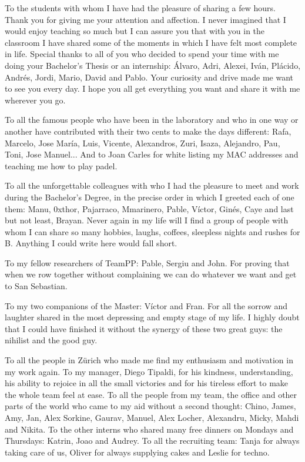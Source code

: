 To the students with whom I have had the pleasure of sharing a few hours. Thank you for giving me your attention and affection. I never imagined that I would enjoy teaching so much but I can assure you that with you in the classroom I have shared some of the moments in which I have felt most complete in life. Special thanks to all of you who decided to spend your time with me doing your Bachelor's Thesis or  an internship: Álvaro, Adri, Alexei, Iván, Plácido, Andrés, Jordi, Mario, David and Pablo. Your curiosity and drive made me want to see you every day. I hope you all get everything you want and share it with me wherever you go.

To all the famous people who have been in the laboratory and who in one way or another have contributed with their two cents to make the days different: Rafa, Marcelo, Jose María, Luis, Vicente, Alexandros, Zuri, Isaza, Alejandro, Pau, Toni, Jose Manuel... And to Joan Carles for white listing my MAC addresses and teaching me how to play padel.

To all the unforgettable colleagues with who I had the pleasure to meet and work during the Bachelor's Degree, in the precise order in which I greeted each of one them: Manu, 0xthor, Pajarraco, Mmarinero, Pable, Víctor, Ginés, Caye and last but not least, Brayan. Never again in my life will I find a group of people with whom I can share so many hobbies, laughs, coffees, sleepless nights and rushes for B. Anything I could write here would fall short.

To my fellow researchers of TeamPP: Pable, Sergiu and John. For proving that when we row together without complaining we can do whatever we want and get to San Sebastian.

To my two companions of the Master: Víctor and Fran. For all the sorrow and laughter shared in the most depressing and empty stage of my life. I highly doubt that I could have finished it without the synergy of these two great guys: the nihilist and the good guy.

To all the people in Zürich who made me find my enthusiasm and motivation in my work again. To my manager, Diego Tipaldi, for his kindness, understanding, his ability to rejoice in all the small victories and for his tireless effort to make the whole team feel at ease. To all the people from my team, the office and other parts of the world who came to my aid without a second thought: Chino, James, Amy, Jan, Alex Sorkine, Gaurav, Manuel, Alex Locher, Alexandru, Micky, Mahdi and Nikita. To the other interns who shared many free dinners on Mondays and Thursdays: Katrin, Joao and Audrey. To all the recruiting team: Tanja for always taking care of us, Oliver for always supplying cakes and Leslie for techno.

